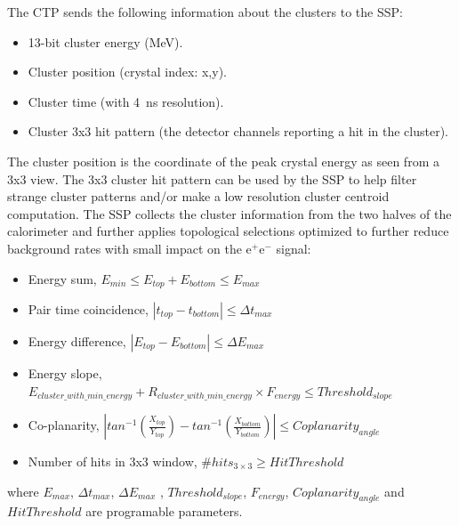 

The CTP sends the following information about the clusters to the SSP:
\begin{itemize}
\item 13-bit cluster energy (MeV).
\item Cluster position (crystal index: x,y).
\item Cluster time (with 4~ns resolution).
\item Cluster 3x3 hit pattern (the detector channels reporting a hit in the cluster).
\end{itemize}
The cluster position is the coordinate of the peak crystal energy as seen from a 3x3 view. The 3x3 cluster hit pattern can be used by the SSP to help filter strange cluster patterns and/or make a low resolution cluster centroid computation.
The SSP collects the cluster information from the two halves of the calorimeter and further applies topological selections optimized to further reduce background rates with small impact on the e$^{+}$e$^{-}$ signal:
\begin{itemize}
\item Energy sum,  
$E_{min}\le E_{top}+E_{bottom}\le E_{max}$
\item Pair time coincidence, 
$|t_{top}-t_{bottom}|\le \Delta t_{max}$ 
\item Energy difference, 
$|E_{top}-E_{bottom}|\le \Delta E_{max}$ 
\item Energy slope,
$E_{cluster\_with\_min\_energy}+R_{cluster\_with\_min\_energy}\times F_{energy}\le Threshold_{slope}$
\item Co-planarity, 
$|
tan^{-1}(\frac{X_{top}}{Y_{top}})-
tan^{-1}(\frac{X_{bottom}}{Y_{bottom}}) |\le Coplanarity_{angle}$
\item Number of hits in 3x3 window, 
\#$hits_{3\times 3}\ge HitThreshold$
\end{itemize}
\noindent
where $ E_{max}$,  $\Delta t_{max}$, $ \Delta E_{max}$ , $Threshold_{slope}$, 
$F_{energy}$, $Coplanarity_{angle}$
and
$HitThreshold$ are programable parameters.

